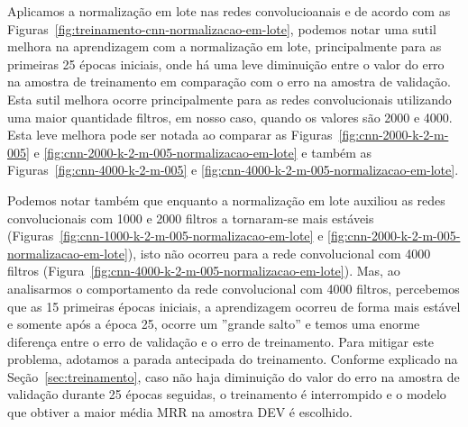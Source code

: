 Aplicamos a normalização em lote nas redes convolucioanais e de acordo com as Figuras~\ref{fig:treinamento-cnn-normalizacao-em-lote}, podemos notar uma sutil melhora na aprendizagem com a normalização em lote, principalmente para as primeiras 25 épocas iniciais, onde há uma leve diminuição entre o valor do erro na amostra de treinamento em comparação com o erro na amostra de validação. Esta sutil melhora ocorre principalmente para as redes convolucionais utilizando uma maior quantidade filtros, em nosso caso, quando os valores são 2000 e 4000. Esta leve melhora pode ser notada ao comparar as Figuras~\ref{fig:cnn-2000-k-2-m-005} e \ref{fig:cnn-2000-k-2-m-005-normalizacao-em-lote} e também as Figuras~\ref{fig:cnn-4000-k-2-m-005} e \ref{fig:cnn-4000-k-2-m-005-normalizacao-em-lote}.

Podemos notar também que enquanto a normalização em lote auxiliou as redes convolucionais com 1000 e 2000 filtros a tornaram-se mais estáveis (Figuras~\ref{fig:cnn-1000-k-2-m-005-normalizacao-em-lote} e \ref{fig:cnn-2000-k-2-m-005-normalizacao-em-lote}), isto não ocorreu para a rede convolucional com 4000 filtros (Figura~\ref{fig:cnn-4000-k-2-m-005-normalizacao-em-lote}). Mas, ao analisarmos o comportamento da rede convolucional com 4000 filtros, percebemos que as 15 primeiras épocas iniciais, a aprendizagem ocorreu de forma mais estável e somente após a época 25, ocorre um ''grande salto'' e temos uma enorme diferença entre o erro de validação e o erro de treinamento. Para mitigar este problema, adotamos a parada antecipada do treinamento. Conforme explicado na Seção~\ref{sec:treinamento}, caso não haja diminuição do valor do erro na amostra de validação durante 25 épocas seguidas, o treinamento é interrompido e o modelo que obtiver a maior média MRR na amostra DEV é escolhido.

